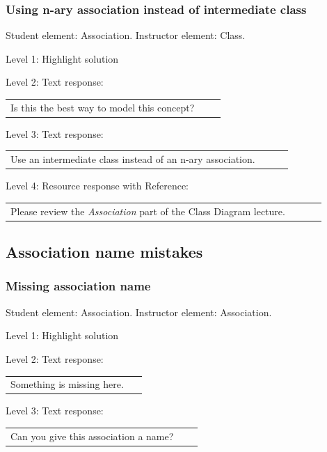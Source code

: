 \subsubsection{Using n-ary association instead of intermediate class}

Student element: Association. Instructor element: Class. \medskip

\noindent Level 1: Highlight solution  \medskip

\noindent Level 2: Text response: \medskip

\begin{tabular}{|p{0.9\linewidth}}
Is this the best way to model this concept?
\end{tabular} \medskip

\noindent Level 3: Text response: \medskip

\begin{tabular}{|p{0.9\linewidth}}
Use an intermediate class instead of an n-ary association.
\end{tabular} \medskip

\noindent Level 4: Resource response with Reference: \medskip

\begin{tabular}{|p{0.9\linewidth}}
Please review the \textit{Association} part of the Class Diagram lecture.
\end{tabular} \medskip


\subsection{Association name mistakes}

\subsubsection{Missing association name}

Student element: Association. Instructor element: Association. \medskip

\noindent Level 1: Highlight solution  \medskip

\noindent Level 2: Text response: \medskip

\begin{tabular}{|p{0.9\linewidth}}
Something is missing here.
\end{tabular} \medskip

\noindent Level 3: Text response: \medskip

\begin{tabular}{|p{0.9\linewidth}}
Can you give this association a name?
\end{tabular} \medskip

